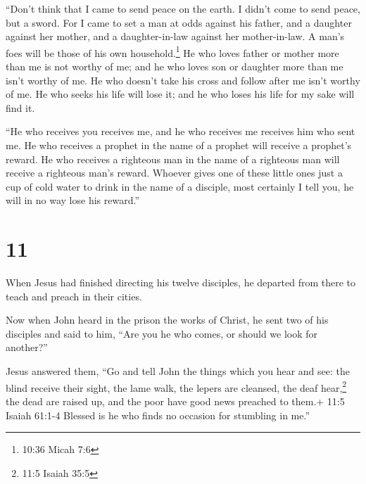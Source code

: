  ``Don't think that I came to send peace on the earth. I
didn't come to send peace, but a sword.  For I came to set
a man at odds against his father, and a daughter against her mother, and
a daughter-in-law against her mother-in-law.  A man's foes
will be those of his own household.\footnote{10:36 Micah 7:6}
 He who loves father or mother more than me is not worthy
of me; and he who loves son or daughter more than me isn't worthy of me.
 He who doesn't take his cross and follow after me isn't
worthy of me.  He who seeks his life will lose it; and he
who loses his life for my sake will find it.

 ``He who receives you receives me, and he who receives me
receives him who sent me.  He who receives a prophet in the
name of a prophet will receive a prophet's reward. He who receives a
righteous man in the name of a righteous man will receive a righteous
man's reward.  Whoever gives one of these little ones just
a cup of cold water to drink in the name of a disciple, most certainly I
tell you, he will in no way lose his reward.''

\hypertarget{section-10}{%
\section{11}\label{section-10}}

 When Jesus had finished directing his twelve disciples, he
departed from there to teach and preach in their cities.

 Now when John heard in the prison the works of Christ, he
sent two of his disciples  and said to him, ``Are you he who
comes, or should we look for another?''

 Jesus answered them, ``Go and tell John the things which
you hear and see:  the blind receive their sight, the lame
walk, the lepers are cleansed, the deaf hear,\footnote{11:5 Isaiah 35:5}
the dead are raised up, and the poor have good news preached to them.+
11:5 Isaiah 61:1-4  Blessed is he who finds no occasion for
stumbling in me.''

